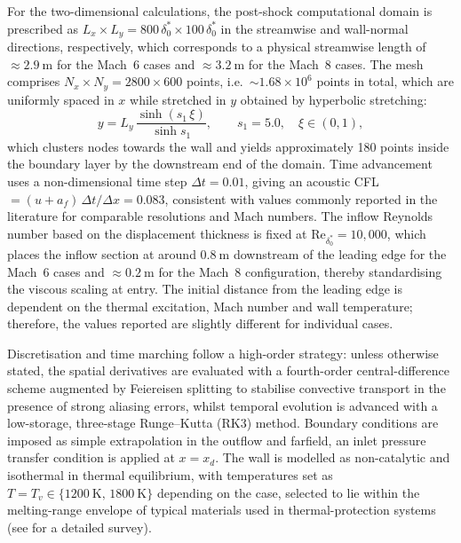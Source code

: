 For the two-dimensional calculations, the post-shock computational domain is prescribed as $L_x\times L_y=800\,\delta^{*}_{0}\times 100\,\delta^{*}_{0}$ in the streamwise and wall-normal directions, respectively, which corresponds to a physical streamwise length of $\approx 2.9~\mathrm{m}$ for the Mach~6 cases and $\approx 3.2~\mathrm{m}$ for the Mach~8 cases. The mesh comprises $N_x\times N_y=2800\times 600$ points, i.e.\ $\sim 1.68\times 10^{6}$ points in total, which are uniformly spaced in $x$ while stretched in $y$ obtained by hyperbolic stretching:
\begin{equation}
y=L_y\,\frac{\sinh\!\left(s_1\,\xi\right)}{\sinh s_1},\qquad s_1=5.0,\quad \xi\in(0,1),
\end{equation}
which clusters nodes towards the wall and yields approximately 180 points inside the boundary layer by the downstream end of the domain. Time advancement uses a non-dimensional time step $\Delta t=0.01$, giving an acoustic \gls{CFL}$=(u+a_f)\,\Delta t/\Delta x=0.083$, consistent with values commonly reported in the literature for comparable resolutions and Mach numbers. The inflow Reynolds number based on the displacement thickness is fixed at $\mathrm{Re}_{\delta^{*}_0}=10{,}000$, which places the inflow section at around $ 0.8~\mathrm{m}$ downstream of the leading edge for the Mach~6 cases and $\approx 0.2~\mathrm{m}$ for the Mach~8 configuration, thereby standardising the viscous scaling at entry. The initial distance from the leading edge is dependent on the thermal excitation, Mach number and wall temperature; therefore, the values reported are slightly different for individual cases.

Discretisation and time marching follow a high-order strategy: unless otherwise stated, the spatial derivatives are evaluated with a fourth-order central-difference scheme augmented by Feiereisen splitting to stabilise convective transport in the presence of strong aliasing errors, whilst temporal evolution is advanced with a low-storage, three-stage Runge--Kutta (RK3) method. Boundary conditions are imposed as simple extrapolation in the outflow and farfield, an inlet pressure transfer condition is applied at $x=x_d$. The wall is modelled as non-catalytic and isothermal in thermal equilibrium, with temperatures set as $T=T_v\in\{1200~\mathrm{K},\,1800~\mathrm{K}\}$ depending on the case, selected to lie within the melting-range envelope of typical materials used in thermal-protection systems (see \cite{CedillosBarraza2016} for a detailed survey).

